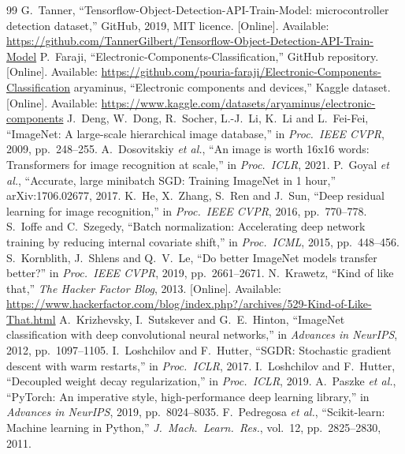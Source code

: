 \documentclass[11pt,a4paper]{article}
\begin{document}
\begin{thebibliography}{99}\small
{} G.~Tanner, ``Tensorflow-Object-Detection-API-Train-Model: microcontroller detection dataset,'' GitHub, 2019, MIT licence. [Online]. Available: \url{https://github.com/TannerGilbert/Tensorflow-Object-Detection-API-Train-Model}
 P.~Faraji, ``Electronic-Components-Classification,'' GitHub repository. [Online]. Available: \url{https://github.com/pouria-faraji/Electronic-Components-Classification}
 aryaminus, ``Electronic components and devices,'' Kaggle dataset. [Online]. Available: \url{https://www.kaggle.com/datasets/aryaminus/electronic-components}
 J.~Deng, W.~Dong, R.~Socher, L.-J.~Li, K.~Li and L.~Fei-Fei, ``ImageNet: A large-scale hierarchical image database,'' in \emph{Proc.\ IEEE CVPR}, 2009, pp.~248--255.
 A.~Dosovitskiy \emph{et al.}, ``An image is worth 16x16 words: Transformers for image recognition at scale,'' in \emph{Proc.\ ICLR}, 2021.
 P.~Goyal \emph{et al.}, ``Accurate, large minibatch SGD: Training ImageNet in 1 hour,'' arXiv:1706.02677, 2017.
 K.~He, X.~Zhang, S.~Ren and J.~Sun, ``Deep residual learning for image recognition,'' in \emph{Proc.\ IEEE CVPR}, 2016, pp.~770--778.
 S.~Ioffe and C.~Szegedy, ``Batch normalization: Accelerating deep network training by reducing internal covariate shift,'' in \emph{Proc.\ ICML}, 2015, pp.~448--456.
 S.~Kornblith, J.~Shlens and Q.~V.~Le, ``Do better ImageNet models transfer better?'' in \emph{Proc.\ IEEE CVPR}, 2019, pp.~2661--2671.
 N.~Krawetz, ``Kind of like that,'' \emph{The Hacker Factor Blog}, 2013. [Online]. Available: \url{https://www.hackerfactor.com/blog/index.php?/archives/529-Kind-of-Like-That.html}
 A.~Krizhevsky, I.~Sutskever and G.~E.~Hinton, ``ImageNet classification with deep convolutional neural networks,'' in \emph{Advances in NeurIPS}, 2012, pp.~1097--1105.
 I.~Loshchilov and F.~Hutter, ``SGDR: Stochastic gradient descent with warm restarts,'' in \emph{Proc.\ ICLR}, 2017.
 I.~Loshchilov and F.~Hutter, ``Decoupled weight decay regularization,'' in \emph{Proc.\ ICLR}, 2019.
 A.~Paszke \emph{et al.}, ``PyTorch: An imperative style, high-performance deep learning library,'' in \emph{Advances in NeurIPS}, 2019, pp.~8024--8035.
 F.~Pedregosa \emph{et al.}, ``Scikit-learn: Machine learning in Python,'' \emph{J.\ Mach.\ Learn.\ Res.}, vol.~12, pp.~2825--2830, 2011.

\end{thebibliography}
\end{document}
